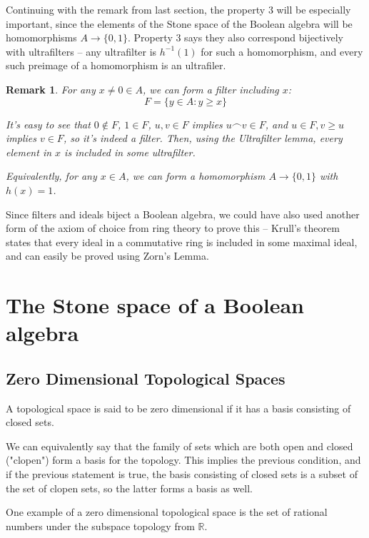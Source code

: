 \documentclass{article}
\newtheorem*{remark}{Remark}
\begin{document}
      Continuing with the remark from last section, the property $3$ will be
      especially important, since the elements of the Stone space of the
      Boolean algebra will be homomorphisms $A \to \{0,1\}$. Property 3 says
      they also correspond bijectively with ultrafilters -- any ultrafilter is
      $h^{-1}(1)$ for such a homomorphism, and every such preimage of a
      homomorphism is an ultrafiler.

      \begin{remark}
      For any $x \neq 0 \in A$, we can form a filter including $x$:
      \[ F = \{y \in A: y \geq x\}\]

      It's easy to see that $0 \notin F$, $1 \in F$, $u, v \in F$ implies $u
      \frown v \in F$, and $u \in F, v \geq u$ implies $v \in F$, so it's indeed
      a filter. Then, using the Ultrafilter lemma, every element in $x$ is
      included in some ultrafilter.

      Equivalently, for any $x \in A$, we can form a homomorphism $A \rightarrow
      \{0,1\}$ with $h(x)=1$.
      \end{remark}

      Since filters and ideals biject a Boolean algebra, we could have also used
      another form of the axiom of choice from ring theory to prove this --
      Krull's theorem states that every ideal in a commutative ring is included
      in some maximal ideal, and can easily be proved using Zorn's Lemma.


    \section{The Stone space of a Boolean algebra}

      \subsection{Zero Dimensional Topological Spaces}

        A topological space is said to be zero dimensional if it has a basis
        consisting of closed sets.

        We can equivalently say that the family of sets which are both open and
        closed ("clopen") form a basis for the topology. This implies
        the previous condition, and if the previous statement is true, the basis
        consisting of closed sets is a subset of the set of clopen sets, so the
        latter forms a basis as well.

        One example of a zero dimensional topological space is the set of
        rational numbers under the subspace topology from $\mathbb{R}$.
\end{document}
